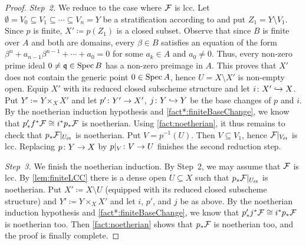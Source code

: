 \begin{proof}
	\emph{Step~2.} We reduce to the case where $\mathcal{F}$ is lcc. Let $\emptyset=V_0\subseteq V_1\subseteq \dotsb \subseteq V_n=Y$ be a stratification according to  and put $Z_1=Y\setminus V_1$. Since $p$ is finite, $X'\coloneqq p(Z_1)$ is a closed subset. Observe that since $B$ is finite over $A$ and both are domains, every $\beta\in B$ satisfies an equation of the form $\beta^n+a_{n-1}\beta^{n-1}+\dotsb+a_0=0$ for some $a_k\in A$ and $a_0\neq 0$. Thus, every non-zero prime ideal $0\neq \mathfrak{q}\in \operatorname{Spec} B$ has a non-zero preimage in $A$. This proves that $X'$ does not contain the generic point $0\in \operatorname{Spec} A$, hence $U=X\setminus X'$ is non-empty open. Equip $X'$ with its reduced closed subscheme structure and let $i\colon X'\monomorphism X$. Put $Y'\coloneqq Y\times_XX'$ and let $p'\colon Y'\morphism X'$, $j\colon Y\monomorphism Y$ be the base changes of $p$ and $i$. By the noetherian induction hypothesis and \cref{fact*:finiteBaseChange}, we know that $p'_*f^*\mathcal{F}\cong i^*p_*\mathcal{F}$ is noetherian. Using \cref{fact:noetherian}, it thus remains to check that $p_*\mathcal{F}|_{U_{\mathrm{\acute{e}t}}}$ is noetherian. Put $V=p^{-1}(U)$. Then $V\subseteq V_1$, hence $\mathcal{F}|_{V_{\mathrm{\acute{e}t}}}$ is lcc. Replacing $p\colon Y\morphism X$ by $p|_V\colon V\morphism U$ finishes the second reduction step.
	
	\emph{Step~3.} We finish the noetherian induction. By Step~2, we may assume that $\mathcal{F}$ is lcc. By \cref{lem:finiteLCC} there is a dense open $U\subseteq X$ such that $p_*\mathcal{F}|_{U_{\mathrm{\acute{e}t}}}$ is noetherian. Put $X'\coloneqq X\setminus U$ (equipped with its reduced closed subscheme structure) and $Y'\coloneqq Y\times_XX'$ and let $i$, $p'$, and $j$ be as above. By the noetherian induction hypothesis and \cref{fact*:finiteBaseChange}, we know that $p'_*j^*\mathcal{F}\cong i^*p_*\mathcal{F}$ is noetherian too. Then \cref{fact:noetherian} shows that $p_*\mathcal{F}$ is noetherian too, and the proof is finally complete.
\end{proof}
